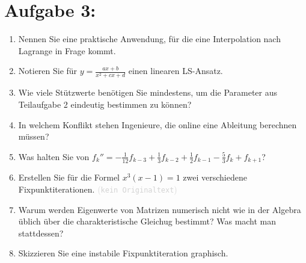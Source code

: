 \documentclass[12pt]{article}
\newcommand{\kommentarMacro}[1]{\textcolor{lightgray}{(\texttt{#1})}}
\begin{document}
\section*{Aufgabe 3:}
\begin{enumerate}
	\item Nennen Sie eine praktische Anwendung, für die eine Interpolation nach Lagrange in Frage kommt.

	      \vspace{1.5cm}

	\item Notieren Sie für $y = \frac{ax + b}{x^2 + cx + d}$ einen linearen LS-Ansatz.

	      \vspace{1.5cm}

	\item Wie viele Stützwerte benötigen Sie mindestens, um die Parameter aus Teilaufgabe 2 eindeutig bestimmen zu können?

	      \vspace{1.5cm}

	\item In welchem Konflikt stehen Ingenieure, die online eine Ableitung berechnen müssen?

	      \vspace{1.5cm}

	\item Was halten Sie von $f_k'' = -\frac{1}{12}f_{k-3}+ \frac{1}{3}f_{k-2} + \frac{1}{2}f_{k-1} - \frac{5}{3}f_k + f_{k+1}$?

	      \vspace{1.5cm}

	\item Erstellen Sie für die Formel $x^3\left(x-1\right)=1$ zwei verschiedene Fixpunktiterationen. \kommentarMacro{kein Originaltext}

	      \vspace{1.5cm}


	\item Warum werden Eigenwerte von Matrizen numerisch nicht wie in der Algebra üblich über die charakteristische Gleichug bestimmt? Was macht man stattdessen?

	      \vspace{1.5cm}

	\item Skizzieren Sie eine instabile Fixpunktiteration graphisch.

\end{enumerate}
\pagebreak
\end{document}
